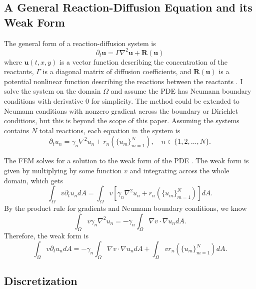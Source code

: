 \subsection{A General Reaction-Diffusion Equation and its Weak Form}

The general form of a reaction-diffusion system is
\[
    \partial_t \mathbf{u} = \Gamma \nabla^2 \mathbf{u} + \mathbf{R} (\mathbf{u})
\]
where $\mathbf{u}(t, x, y)$ is a vector function describing the concentration of the reactants, $\Gamma$ is a diagonal matrix of diffusion coefficients, and $\mathbf{R}(\mathbf{u})$ is a potential nonlinear function describing the reactions between the reactants \parencite{martin1992nonlinear}. I solve the system on the domain $\Omega$ and assume the PDE has Neumann boundary conditions with derivative 0 for simplicity. The method could be extended to Neumann conditions with nonzero gradient across the boundary or Dirichlet conditions, but this is beyond the scope of this paper. Assuming the systems contains $N$ total reactions, each equation in the system is
\[
    \partial_t u_n = \gamma_n \nabla^2 u_n + r_n\left(\{u_m\}_{m = 1}^{N}\right), \quad n \in \{1, 2, \dots, N\}.
\]

The FEM solves for a solution to the weak form of the PDE \parencite{galerkin1968rods}. The weak form is given by multiplying by some function $v$ and integrating across the whole domain, which gets
\[
    \int_\Omega v \partial_t u_n dA = \int_\Omega v \left[ \gamma_n \nabla^2 u_n + r_n\left(\{u_m\}_{m = 1}^{N}\right)\right] dA.
\]
By the product rule for gradients and Neumann boundary conditions, we know
\[
    \int_\Omega v \gamma_n \nabla^2 u_n = -\gamma_n \int_\Omega \nabla v \cdot \nabla u_n dA.
\]
Therefore, the weak form is
\[
    \int_\Omega v \partial_t u_n dA = -\gamma_n \int_\Omega \nabla v \cdot \nabla u_n dA + \int_\Omega v r_n\left(\{u_m\}_{m = 1}^{N}\right) dA.
\]


\subsection{Discretization}

